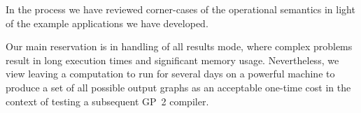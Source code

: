 In the process we have reviewed corner-cases of the operational semantics in light of the example applications we have developed.


Our main reservation is in handling of all results mode, where complex problems result in long execution times and significant memory usage. Nevertheless, we view leaving a computation to run for several days on a powerful machine to produce a set of all possible output graphs as an acceptable one-time cost in the context of testing a subsequent GP~2 compiler. 




